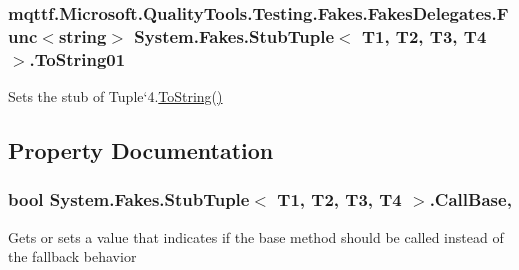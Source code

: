 \hypertarget{class_system_1_1_fakes_1_1_stub_tuple_3_01_t1_00_01_t2_00_01_t3_00_01_t4_01_4_a34dbd34860fe0d6373c9cb476f6f4d4e}{
\subsubsection[{To\-String01}]{\setlength{\rightskip}{0pt plus 5cm}mqttf.\-Microsoft.\-Quality\-Tools.\-Testing.\-Fakes.\-Fakes\-Delegates.\-Func$<$string$>$ System.\-Fakes.\-Stub\-Tuple$<$ T1, T2, T3, T4 $>$.To\-String01}}\label{class_system_1_1_fakes_1_1_stub_tuple_3_01_t1_00_01_t2_00_01_t3_00_01_t4_01_4_a34dbd34860fe0d6373c9cb476f6f4d4e}


Sets the stub of Tuple`4.\hyperlink{class_system_1_1_fakes_1_1_stub_tuple_3_01_t1_00_01_t2_00_01_t3_00_01_t4_01_4_af47bd19056b77b15be4aef2156d44868}{To\-String()}



\subsection{Property Documentation}
\hypertarget{class_system_1_1_fakes_1_1_stub_tuple_3_01_t1_00_01_t2_00_01_t3_00_01_t4_01_4_a18756fdfef1b8257059e98204edf227a}{
\subsubsection[{Call\-Base}]{\setlength{\rightskip}{0pt plus 5cm}bool System.\-Fakes.\-Stub\-Tuple$<$ T1, T2, T3, T4 $>$.Call\-Base\hspace{0.3cm}{\ttfamily [get]}, {\ttfamily [set]}}}\label{class_system_1_1_fakes_1_1_stub_tuple_3_01_t1_00_01_t2_00_01_t3_00_01_t4_01_4_a18756fdfef1b8257059e98204edf227a}


Gets or sets a value that indicates if the base method should be called instead of the fallback behavior

